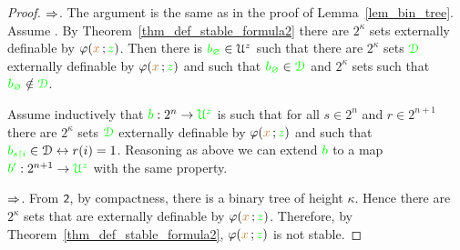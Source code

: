 \documentclass[creche.tex]{subfiles}
\begin{document}
\begin{proof}
  $\Rightarrow$.
  The argument is the same as in the proof of Lemma~\ref{lem_bin_tree}.
  Assume . 
  By Theorem~\ref{thm_def_stable_formula2} there are $2^\kappa$ sets externally definable by $\varphi({\color{brown} x}\,;{\color{green} z})$.
  Then there is ${\color{green} b_\varnothing}\in{\EuScript U^z}$ such that there are $2^\kappa$ sets ${\color{green}\EuScript D}$ externally definable by $\varphi({\color{brown} x}\,;{\color{green} z})$ and such that ${\color{green} b_\varnothing}\in{\color{green}\EuScript D}$ and $2^\kappa$ sets such that ${\color{green} b_\varnothing}\notin{\color{green}\EuScript D}$.

  Assume inductively that ${\color{green} b}:2^n\to{\color{green}\EuScript U^z}$ is such that for all $s\in2^n$ and $r\in2^{n+1}$ there are $2^\kappa$ sets ${\color{green}\EuScript D}$ externally definable by $\varphi({\color{brown} x}\,;{\color{green} z})$ and such that ${\color{green} b_{s\restriction i}}\in\EuScript D\leftrightarrow r(i)=1$.
  Reasoning as above we can extend ${\color{green} b}$ to a map ${\color{green} b'}:2^{n+1}\to{\color{green}\EuScript U^z}$ with the same property.

  


  






  $\Rightarrow$. From $\textsf{\small 2}$, by compactness, there is a binary tree of height $\kappa$. 
  Hence there are $2^\kappa$ sets that are externally definable by $\varphi({\color{brown} x}\,;{\color{green} z})$.
  Therefore, by Theorem~\ref{thm_def_stable_formula2}, $\varphi({\color{brown} x}\,;{\color{green} z})$ is not stable.
\end{proof}
\end{document}
